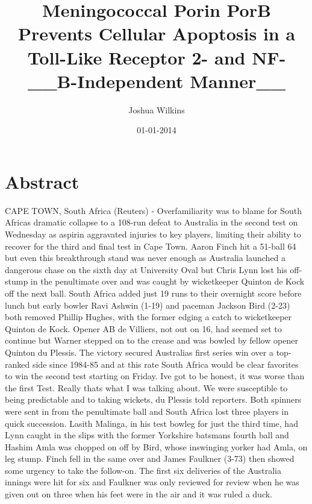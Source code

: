 \documentclass{article}%
\title{Meningococcal Porin PorB Prevents Cellular Apoptosis in a Toll{-}Like Receptor 2{-} and NF{-}\_\_B{-}Independent Manner\_\_}%
\author{Joshua Wilkins}%
\affil{Department of Surgery, Faculty of Medicine, School of Medicine, Kaohsiung Medical University, Kaohsiung, Taiwan}%
\date{01{-}01{-}2014}%
\begin{document}
%
\normalsize%
\maketitle%
\section{Abstract}%
\label{sec:Abstract}%
CAPE TOWN, South Africa (Reuters) {-} Overfamiliarity was to blame for South Africas dramatic collapse to a 108{-}run defeat to Australia in the second test on Wednesday as aspirin aggravated injuries to key players, limiting their ability to recover for the third and final test in Cape Town.\newline%
Aaron Finch hit a 51{-}ball 64 but even this breakthrough stand was never enough as Australia launched a dangerous chase on the sixth day at University Oval but Chris Lynn lost his off{-}stump in the penultimate over and was caught by wicketkeeper Quinton de Kock off the next ball.\newline%
South Africa added just 19 runs to their overnight score before lunch but early bowler Ravi Ashwin (1{-}19) and paceman Jackson Bird (2{-}23) both removed Phillip Hughes, with the former edging a catch to wicketkeeper Quinton de Kock.\newline%
Opener AB de Villiers, not out on 16, had seemed set to continue but Warner stepped on to the crease and was bowled by fellow opener Quinton du Plessis.\newline%
The victory secured Australias first series win over a top{-}ranked side since 1984{-}85 and at this rate South Africa would be clear favorites to win the second test starting on Friday.\newline%
Ive got to be honest, it was worse than the first Test. Really thats what I was talking about. We were susceptible to being predictable and to taking wickets, du Plessis told reporters.\newline%
Both spinners were sent in from the penultimate ball and South Africa lost three players in quick succession. Lasith Malinga, in his test bowleg for just the third time, had Lynn caught in the slips with the former Yorkshire batsmans fourth ball and Hashim Amla was chopped on off by Bird, whose inswinging yorker had Amla, on leg stump.\newline%
Finch fell in the same over and James Faulkner (3{-}73) then showed some urgency to take the follow{-}on.\newline%
The first six deliveries of the Australia innings were hit for six and Faulkner was only reviewed for review when he was given out on three when his feet were in the air and it was ruled a duck.\newline%
\end{document}
